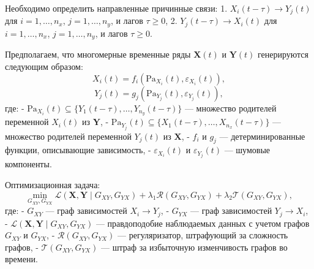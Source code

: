 \documentclass[a4paper, 12pt]{article}
\begin{document}
	Необходимо определить направленные причинные связи:
	1. \( X_i(t-\tau) \to Y_j(t) \) для \( i = 1, \ldots, n_x \), \( j = 1, \ldots, n_y \), и лагов \( \tau \geq 0 \),
	2. \( Y_j(t-\tau) \to X_i(t) \) для \( i = 1, \ldots, n_x \), \( j = 1, \ldots, n_y \), и лагов \( \tau \geq 0 \).
	
	Предполагаем, что многомерные временные ряды \( \mathbf{X}(t) \) и \( \mathbf{Y}(t) \) генерируются следующим образом:
	\[
	X_i(t) = f_i(\text{Pa}_{X_i}(t), \varepsilon_{X_i}(t)),
	\]
	\[
	Y_j(t) = g_j(\text{Pa}_{Y_j}(t), \varepsilon_{Y_j}(t)),
	\]
	где:
	- \( \text{Pa}_{X_i}(t) \subseteq \{Y_1(t-\tau), \ldots, Y_{n_y}(t-\tau)\} \) — множество родителей переменной \( X_i(t) \) из \( \mathbf{Y} \),
	- \( \text{Pa}_{Y_j}(t) \subseteq \{X_1(t-\tau), \ldots, X_{n_x}(t-\tau)\} \) — множество родителей переменной \( Y_j(t) \) из \( \mathbf{X} \),
	- \( f_i \) и \( g_j \) — детерминированные функции, описывающие зависимость,
	- \( \varepsilon_{X_i}(t) \) и \( \varepsilon_{Y_j}(t) \) — шумовые компоненты.
	
	Оптимизационная задача:
	\[
	\min_{G_{XY}, G_{YX}} \mathcal{L}(\mathbf{X}, \mathbf{Y} \mid G_{XY}, G_{YX}) + \lambda_1 \mathcal{R}(G_{XY}, G_{YX}) + \lambda_2 \mathcal{T}(G_{XY}, G_{YX}),
	\]
	где:
	- \( G_{XY} \) — граф зависимостей \( X_i \to Y_j \),
	- \( G_{YX} \) — граф зависимостей \( Y_j \to X_i \),
	- \( \mathcal{L}(\mathbf{X}, \mathbf{Y} \mid G_{XY}, G_{YX}) \) — правдоподобие наблюдаемых данных с учетом графов \( G_{XY} \) и \( G_{YX} \),
	- \( \mathcal{R}(G_{XY}, G_{YX}) \) — регуляризатор, штрафующий за сложность графов,
	- \( \mathcal{T}(G_{XY}, G_{YX}) \) — штраф за избыточную изменчивость графов во времени.
	
\end{document}
